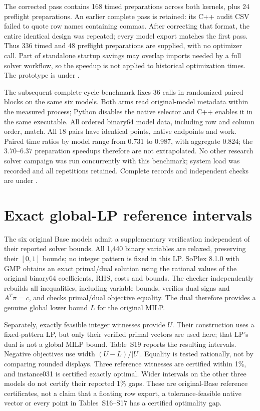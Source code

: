 \documentclass[11pt]{article}
\begin{document}
The corrected pass contains 168 timed preparations across both kernels, plus 24
preflight preparations. An earlier complete pass is retained: its C++ audit CSV
failed to quote row names containing commas. After correcting that format, the
entire identical design was repeated; every model export matches the first pass.
Thus 336 timed and 48 preflight preparations are supplied, with no optimizer call.
Part of standalone startup savings may overlap imports needed by a full solver
workflow, so the speedup is not applied to historical optimization times.
The prototype is under .

The subsequent complete-cycle benchmark fixes 36 calls in randomized paired
blocks on the same six models. Both arms read original-model metadata within
the measured process; Python disables the native selector and C++ enables it
in the same executable. All ordered binary64 model data, including row and
column order, match. All 18 pairs have identical points, native endpoints and
work. Paired time ratios by model range from 0.731 to 0.987, with aggregate
0.824; the 3.70--6.37 preparation speedups therefore are not extrapolated.
No other research solver campaign was run concurrently with this benchmark;
system load was recorded and all repetitions retained. Complete records and
independent checks are under
.

\FloatBarrier
\section{Exact global-LP reference intervals}
The six original Base models admit a supplementary verification independent of
their reported solver bounds. All 1,440 binary variables are relaxed, preserving
their $[0,1]$ bounds; no integer pattern is fixed in this LP. SoPlex 8.1.0 with
GMP obtains an exact primal/dual solution using the rational values of the original
binary64 coefficients, RHS, costs and bounds. The checker independently rebuilds
all inequalities, including variable bounds, verifies dual signs and $A^T\pi=c$,
and checks primal/dual objective equality. The dual therefore provides a genuine
global lower bound $L$ for the original MILP.

Separately, exactly feasible integer witnesses provide $U$. Their construction
uses a fixed-pattern LP, but only their verified primal vectors are used here;
that LP's dual is not a global MILP bound. Table~S19 reports the resulting
intervals. Negative objectives use width $(U-L)/|U|$. Equality is tested rationally,
not by comparing rounded displays. Three reference witnesses are certified within
1\%, and instance031 is certified exactly optimal. Wider intervals on the other
three models do not certify their reported 1\% gaps. These are original-Base
reference certificates, not a claim that a floating row export, a tolerance-feasible
native vector or every point in Tables~S16--S17 has a certified optimality gap.
\end{document}
